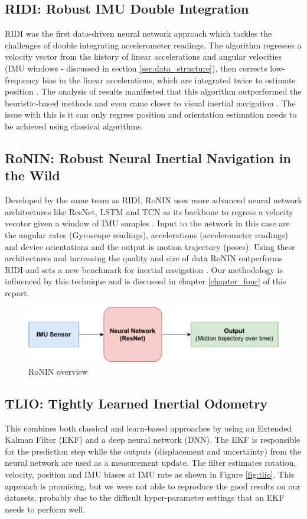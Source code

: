 \subsection{RIDI: Robust IMU Double Integration}
RIDI was the first data-driven neural network approach which tackles the challenges of double integrating accelerometer readings. The algorithm regresses a velocity vector from the history of linear accelerations and angular velocities (IMU windows - discussed in section \ref{sec:data_structure}), then corrects low-frequency bias in the linear accelerations, which are integrated twice to estimate position \citep{yan2018ridi}. The analysis of results manifested that this algorithm outperformed the heuristic-based methods and even came closer to visual inertial navigation \citep{yan2018ridi}. The issue with this is it can only regress position and orientation estimation needs to be achieved using classical algorithms.

\subsection{RoNIN: Robust Neural Inertial Navigation in the Wild}
Developed by the same team as RIDI, RoNIN uses more advanced neural network architectures like ResNet, LSTM and TCN as its backbone to regress a velocity vecotor given a window of IMU samples \citep{herath2020ronin}. Input to the network in this case are the angular rates (Gyroscope readings), accelerations (accelerometer readings) and device orientations and the output is motion trajectory (poses). Using these architectures and increasing the quality and size of data RoNIN outperforms RIDI and sets a new benchmark for inertial navigation \citep{herath2020ronin}. Our methodology is influenced by this technique and is discussed in chapter \ref{chapter_four} of this report.

\begin{figure}[H]
    \centering
    \includegraphics[scale=0.8]{images/fig_chapter3/ronin.pdf}
    \caption{RoNIN overview}
    \label{fig:ronin}
\end{figure}

\subsection{TLIO: Tightly Learned Inertial Odometry}
This combines both classical and learn-based approaches by using an Extended Kalman Filter (EKF) and a deep neural network (DNN). The EKF is responsible for the prediction step while the outputs (displacement and uncertainty) from the neural network are used as a measurement update. The filter estimates rotation, velocity, position and IMU biases at IMU rate \citep{liu2020tlio} as shown in Figure \ref{fig:tlio}. This approach is promising, but we were not able to reproduce the good results on our datasets, probably due to the difficult hyper-parameter settings that an EKF needs to perform well.

